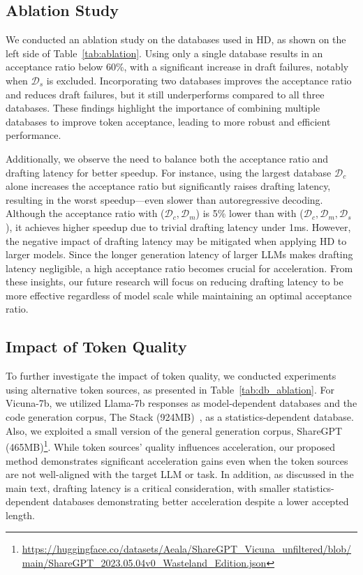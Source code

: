 \subsection{Ablation Study}


% 

We conducted an ablation study on the databases used in HD, as shown on the left side of Table~\ref{tab:ablation}. Using only a single database results in an acceptance ratio below 60\%, with a significant increase in draft failures, notably when $\mathcal{D}_s$ is excluded. Incorporating two databases improves the acceptance ratio and reduces draft failures, but it still underperforms compared to all three databases. These findings highlight the importance of combining multiple databases to improve token acceptance, leading to more robust and efficient performance.

Additionally, we observe the need to balance both the acceptance ratio and drafting latency for better speedup. For instance, using the largest database $\mathcal{D}_c$ alone increases the acceptance ratio but significantly raises drafting latency, resulting in the worst speedup—even slower than autoregressive decoding. Although the acceptance ratio with ($\mathcal{D}_c, \mathcal{D}_m$) is 5\% lower than with ($\mathcal{D}_c, \mathcal{D}_m, \mathcal{D}_s$), it achieves higher speedup due to trivial drafting latency under 1ms. However, the negative impact of drafting latency may be mitigated when applying HD to larger models. Since the longer generation latency of larger LLMs makes drafting latency negligible, a high acceptance ratio becomes crucial for acceleration. From these insights, our future research will focus on reducing drafting latency to be more effective regardless of model scale while maintaining an optimal acceptance ratio.

\subsection{Impact of Token Quality}



To further investigate the impact of token quality, we conducted experiments using alternative token sources, as presented in Table~\ref{tab:db_ablation}. For Vicuna-7b, we utilized Llama-7b responses as model-dependent databases and the code generation corpus, The Stack (924MB)~\cite{Stack}, as a statistics-dependent database. Also, we exploited a small version of the general generation corpus, ShareGPT (465MB)\footnote{\url{https://huggingface.co/datasets/Aeala/ShareGPT_Vicuna_unfiltered/blob/main/ShareGPT_2023.05.04v0_Wasteland_Edition.json}}. While token sources' quality influences acceleration, our proposed method demonstrates significant acceleration gains even when the token sources are not well-aligned with the target LLM or task. In addition, as discussed in the main text, drafting latency is a critical consideration, with smaller statistics-dependent databases demonstrating better acceleration despite a lower accepted length.



